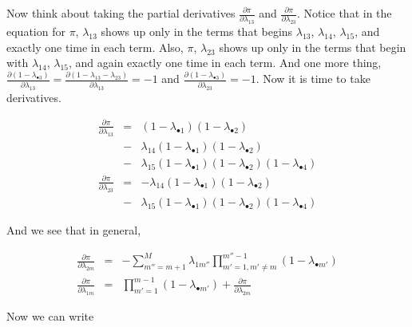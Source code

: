 \documentclass[11pt]{article}
\begin{document}
Now think about taking the partial derivatives
$\frac{\partial \pi}{\partial \lambda_{13} }$ and $\frac{\partial
  \pi}{\partial \lambda_{23} }$.  Notice that in the equation for
$\pi$, $\lambda_{13}$ shows up only in the terms that begins
$\lambda_{13}$,  $\lambda_{14}$,  $\lambda_{15}$, and exactly one time
in each term.  Also, $\pi$, $\lambda_{23}$ shows up only in the terms
that begin with  $\lambda_{14}$,  $\lambda_{15}$, and again exactly
one time in each term.  And one more thing, 
$\frac{\partial (1-\lambda_{\bullet 3})}{\partial \lambda_{13} } =
\frac{\partial (1-\lambda_{1 3} - \lambda_{2 3})}{\partial \lambda_{13} } 
= -1$
and
$\frac{\partial (1-\lambda_{\bullet 3})}{\partial \lambda_{23} } = -1$.
Now it is time to take derivatives.

\begin{eqnarray}
\frac{\partial \pi}{\partial \lambda_{13} } & = &
                               (1-\lambda_{\bullet 1}) (1-\lambda_{\bullet
                                 2})  \nonumber \\
                   & - & \lambda_{14}(1-\lambda_{\bullet 1})
                   (1-\lambda_{\bullet 2}) \nonumber \\
                   & - & \lambda_{15}(1-\lambda_{\bullet 1})
                              (1-\lambda_{\bullet 2})(1-\lambda_{\bullet 4})\\
\frac{\partial \pi}{\partial \lambda_{23} } & = &  
                              -  \lambda_{14}(1-\lambda_{\bullet 1})
                              (1-\lambda_{\bullet 2}) \nonumber \\
                   & - & \lambda_{15}(1-\lambda_{\bullet 1})
                             (1-\lambda_{\bullet 2})
                             (1-\lambda_{\bullet 4})
\end{eqnarray}

And we see that in general,

\begin{eqnarray}
\frac{\partial \pi}{\partial \lambda_{2m} } & = & 
                 -\sum_{m''=m+1}^M \lambda_{1m''} \prod_{m'=1, m' \neq
                   m}^{m''-1}(1-\lambda_{\bullet m'}) \\
\frac{\partial \pi}{\partial \lambda_{1m} } & = &
                  \prod_{m'=1}^{m-1}(1-\lambda_{\bullet m'}) + \frac{\partial
                    \pi}{\partial \lambda_{2m} } \label{eq:endexamp}
\end{eqnarray}

Now we can write 
\end{document}
